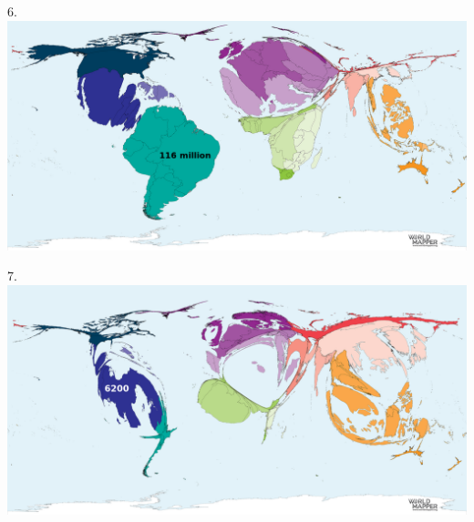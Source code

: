 \begin{frame}
\begin{center}
\Large
6. 
\\
\vspace{0.5em}\includegraphics[height=0.6\paperheight]{maps/picture_6.png}
\\
\end{center}
\end{frame}
\begin{frame}
\begin{center}
\Large
7. 
\\
\vspace{0.5em}\includegraphics[height=0.6\paperheight]{maps/picture_7.png}
\\
\end{center}
\end{frame}
